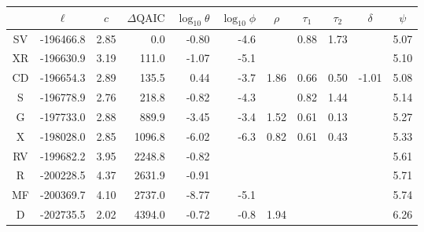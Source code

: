 \begin{tabular}{crrrrrrrrrr}
  \hline
 & \multicolumn{1}{c}{$\ell$} & \multicolumn{1}{c}{$\hat{c}$} & \multicolumn{1}{c}{$\Delta\!\mathrm{QAIC}$} & \multicolumn{1}{c}{$\log_{10}{\theta}$} & \multicolumn{1}{c}{$\log_{10}{\phi}$} & \multicolumn{1}{c}{$\rho$} & \multicolumn{1}{c}{$\tau_1$} & \multicolumn{1}{c}{$\tau_2$} & \multicolumn{1}{c}{$\delta$} & \multicolumn{1}{c}{$\psi$} \\ 
  \hline
SV & -196466.8 & 2.85 & 0.0 & -0.80 & -4.6 &  & 0.88 & 1.73 &  & 5.07 \\ 
  XR & -196630.9 & 3.19 & 111.0 & -1.07 & -5.1 &  &  &  &  & 5.10 \\ 
  CD & -196654.3 & 2.89 & 135.5 & 0.44 & -3.7 & 1.86 & 0.66 & 0.50 & -1.01 & 5.08 \\ 
  S & -196778.9 & 2.76 & 218.8 & -0.82 & -4.3 &  & 0.82 & 1.44 &  & 5.14 \\ 
  G & -197733.0 & 2.88 & 889.9 & -3.45 & -3.4 & 1.52 & 0.61 & 0.13 &  & 5.27 \\ 
  X & -198028.0 & 2.85 & 1096.8 & -6.02 & -6.3 & 0.82 & 0.61 & 0.43 &  & 5.33 \\ 
  RV & -199682.2 & 3.95 & 2248.8 & -0.82 &  &  &  &  &  & 5.61 \\ 
  R & -200228.5 & 4.37 & 2631.9 & -0.91 &  &  &  &  &  & 5.71 \\ 
  MF & -200369.7 & 4.10 & 2737.0 & -8.77 & -5.1 &  &  &  &  & 5.74 \\ 
  D & -202735.5 & 2.02 & 4394.0 & -0.72 & -0.8 & 1.94 &  &  &  & 6.26 \\ 
   \hline
\end{tabular}
